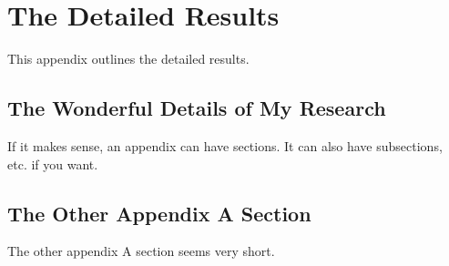 %
%
%
% 
%

\chapter{The Detailed Results}
\label{AppendixA}

This appendix outlines the detailed results.

\section{The Wonderful Details of My Research}
\label{TheWonderfulDetailsOfMyResearch}

If it makes sense, an appendix can have sections.
It can also have subsections, etc. if you want.

\section{The Other Appendix A Section}
\label{TheOtherAppendixASection}

The other appendix A section seems very short.

